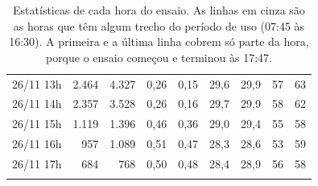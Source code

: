{\begin{longtable}{@{}lrrrrrrrr@{}}
\rowcolor{uso}26/11 13h & 2.464 & 4.327 & 0,26 & 0,15 & 29,6 & 29,9 & 57 & 63 \\
\rowcolor{uso}26/11 14h & 2.357 & 3.528 & 0,26 & 0,16 & 29,7 & 29,9 & 58 & 62 \\
\rowcolor{uso}26/11 15h & 1.119 & 1.396 & 0,46 & 0,36 & 29,0 & 29,4 & 55 & 58 \\
\rowcolor{uso}26/11 16h & 957 & 1.089 & 0,51 & 0,47 & 28,3 & 28,6 & 53 & 59 \\
26/11 17h & 684 & 768 & 0,50 & 0,48 & 28,4 & 28,9 & 56 & 58 \\
\bottomrule
\caption{Estatísticas de cada hora do ensaio. As linhas em cinza são as horas que têm algum trecho do período de uso (07:45 às 16:30). A primeira e a última linha cobrem só parte da hora, porque o ensaio começou e terminou às 17:47.}\label{tab:horas}
\end{longtable}
}
